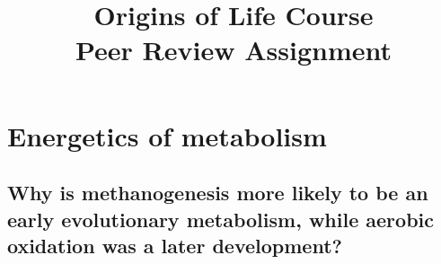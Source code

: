 \documentclass[]{article}
\title{
	Origins of Life Course\\
	Peer Review Assignment
}
\begin{document}
\maketitle

\tableofcontents

\section{Energetics of metabolism}

\subsection[Why is methanogenesis more likely to be an early metabolism?]{
	Why is methanogenesis more likely to be an early evolutionary metabolism, while aerobic oxidation was a later development?
}
\end{document}
